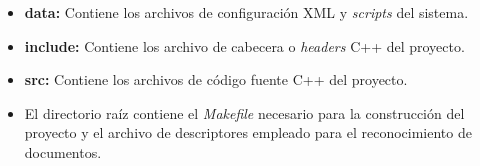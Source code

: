 \begin{itemize}
\item \textbf{data:} Contiene los archivos de configuración \acs{XML} y \textit{scripts} del sistema.
\item \textbf{include:} Contiene los archivo de cabecera o \textit{headers} C++ del proyecto.
\item \textbf{src:} Contiene los archivos de código fuente C++ del proyecto.
\item El directorio raíz contiene el \textit{Makefile} necesario para la construcción del proyecto y
  el archivo de descriptores empleado para el reconocimiento de documentos.
\end{itemize}

